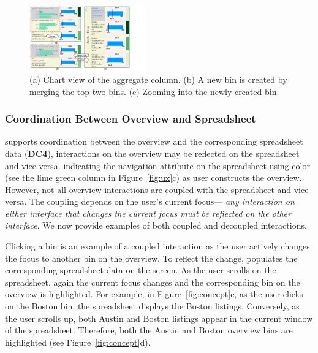 \begin{figure}[!htb]
        \centering
        \vspace{-8pt}
        \includegraphics[width=0.45\textwidth,trim={0 0 130 0},clip]{images/customize.pdf}
\vspace{-10pt}
   \caption{(a) Chart view of the aggregate column. (b) A new bin is created by merging the top two bins. (c) Zooming into the newly created bin. }
\vspace{-10pt}
   \label{fig:customize}
 \end{figure}

\subsubsection{Coordination Between Overview and Spreadsheet}
\noah supports coordination
between the overview and the
corresponding spreadsheet data (\textbf{DC4}),
\ie interactions on the overview
may be reflected on the spreadsheet and vice-versa.
 indicating the navigation attribute on the spreadsheet
using color (see the lime green column in Figure~\ref{fig:ux}c)
as user constructs the overview. However, not all overview interactions are coupled
with the spreadsheet and vice versa.
The coupling depends on the user's current
focus---\emph{ any interaction on
either interface
that changes the current focus must be reflected
on the other interface}.
We now provide examples of both
coupled and decoupled interactions.

Clicking a bin is an example of a coupled interaction
as the user actively changes the focus
to another bin on the overview.
To reflect the change, \noah populates
the corresponding spreadsheet data
on the screen.
As the user scrolls on the spreadsheet,
again the current focus changes
and the corresponding bin on the overview is highlighted.
For example, in Figure~\ref{fig:concept}c,
as the user clicks on the Boston bin,
the spreadsheet displays the Boston listings.
Conversely, as the user scrolls up,
both Austin and Boston listings appear in the current window of the spreadsheet.
Therefore, both the Austin and Boston overview
bins are highlighted
(see Figure~\ref{fig:concept}d).

